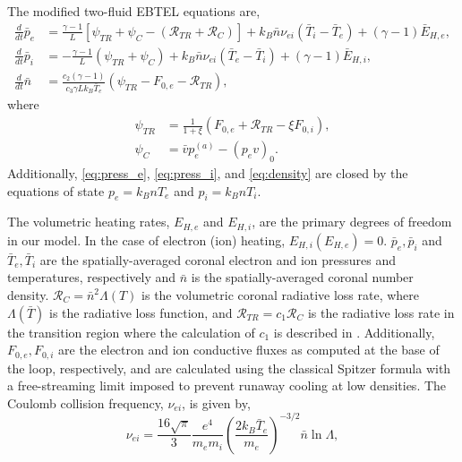 \documentclass[apj]{emulateapj}
\begin{document}
	\section{}
	\label{appendix}
	The modified two-fluid EBTEL equations are,
		\begin{align}
			\frac{d}{dt}\bar{p}_e &= \frac{\gamma - 1}{L}[\psi_{TR} + \psi_C -(\mathcal{R}_{TR} + \mathcal{R}_C)] + k_B\bar{n}\nu_{ei}(\bar{T}_i-\bar{T}_e) + (\gamma-1)\bar{E}_{H,e},\label{eq:press_e} \\[0.5em]
			\frac{d}{dt}\bar{p}_i &= -\frac{\gamma - 1}{L}(\psi_{TR} + \psi_C) + k_B\bar{n}\nu_{ei}(\bar{T}_e-\bar{T}_i) + (\gamma-1)\bar{E}_{H,i},\label{eq:press_i} \\[0.5em]
			\frac{d}{dt}\bar{n} &= \frac{c_2(\gamma-1)}{c_3\gamma Lk_B\bar{T}_e}(\psi_{TR} - F_{0,e}-\mathcal{R}_{TR}), 	\label{eq:density}
		\end{align}
		where 
		\begin{align}
			\psi_{TR} &= \frac{1}{1 + \xi}(F_{0,e} + \mathcal{R}_{TR} - \xi F_{0,i}), \label{eq:psi_tr}\\[0.5em]
			\psi_C  &= \bar{v}p_e^{(a)} - (p_ev)_0. \label{eq:psi_C}
		\end{align}
		Additionally, \autoref{eq:press_e}, \autoref{eq:press_i}, and \autoref{eq:density} are closed by the equations of state $p_e=k_BnT_e$ and $p_i=k_BnT_i$. 
		\par The volumetric heating rates, $E_{H,e}$ and $E_{H,i}$, are the primary degrees of freedom in our model. In the case of electron (ion) heating, $E_{H,i}(E_{H,e})=0$. $\bar{p}_e,\bar{p}_i$ and $\bar{T}_e,\bar{T}_i$ are the spatially-averaged coronal electron and ion pressures and temperatures, respectively and $\bar{n}$ is the spatially-averaged coronal number density. $\mathcal{R}_C=\bar{n}^2\Lambda(T)$ is the volumetric coronal radiative loss rate, where $\Lambda(\bar{T})$ is the radiative loss function, and $\mathcal{R}_{TR}=c_1\mathcal{R}_C$ is the radiative loss rate in the transition region where the calculation of $c_1$ is described in \citet{cargill_enthalpy-based_2012}. Additionally, $F_{0,e},F_{0,i}$ are the electron and ion conductive fluxes as computed at the base of the loop, respectively, and are calculated using the classical Spitzer formula with a free-streaming limit imposed to prevent runaway cooling at low densities. The Coulomb collision frequency, $\nu_{ei}$, is given by,
		\begin{equation}
			\nu_{ei} = \frac{16\sqrt{\pi}}{3}\frac{e^4}{m_em_i}\left(\frac{2k_B\bar{T}_e}{m_e}\right)^{-3/2}\bar{n}\ln{\Lambda},
			\label{eq:col_freq}
		\end{equation}
\end{document}
